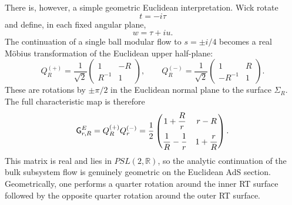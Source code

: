 \documentclass[a4paper,11pt]{article}
\theoremstyle{definition}
\begin{document}
There is, however, a simple geometric Euclidean interpretation. Wick
rotate
\begin{equation}
    t=-i\tau
\end{equation}
and define, in each fixed angular plane,
\begin{equation}
    w=\tau+i u.
\end{equation}
The continuation of a single ball modular flow to $s=\pm i/4$ becomes a
real M\"obius transformation of the Euclidean upper half-plane:
\begin{equation}
    Q_R^{(+)}
    =
    \frac1{\sqrt2}
    \begin{pmatrix}
        1 & -R\\
        R^{-1} & 1
    \end{pmatrix},
    \qquad
    Q_R^{(-)}
    =
    \frac1{\sqrt2}
    \begin{pmatrix}
        1 & R\\
        -R^{-1} & 1
    \end{pmatrix}.
    \label{eq:Euclidean-quarter-rotations}
\end{equation}
These are rotations by $\pm\pi/2$ in the Euclidean normal plane to the
surface $\Sigma_R$. The full characteristic map is therefore
\begin{equation}
    {\sf G}^{E}_{r,R}
    =
    Q_R^{(+)}Q_r^{(-)}
    =
    \frac12
    \begin{pmatrix}
        1+\dfrac{R}{r}
        &
        r-R
        \\[3mm]
        \dfrac1R-\dfrac1r
        &
        1+\dfrac{r}{R}
    \end{pmatrix}.
    \label{eq:Euclidean-characteristic-map}
\end{equation}
This matrix is real and lies in $PSL(2,\mathbb R)$, so the analytic
continuation of the bulk subsystem flow is genuinely geometric on the
Euclidean AdS section. Geometrically, one performs a quarter rotation
around the inner RT surface followed by the opposite quarter rotation
around the outer RT surface.
\end{document}
